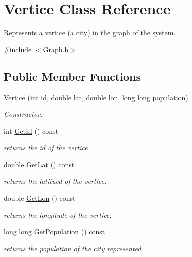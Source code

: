 \hypertarget{classVertice}{}\section{Vertice Class Reference}
\label{classVertice}


Represents a vertice (a city) in the graph of the system.  




{\ttfamily \#include $<$Graph.\+h$>$}

\subsection*{Public Member Functions}
\begin{DoxyCompactItemize}
\item 
\hyperlink{classVertice_a2af39e31011f5d6bf98d02d4570204ac}{Vertice} (int id, double lat, double lon, long long population)
\begin{DoxyCompactList}\small\item\em Constructor. \end{DoxyCompactList}\item 
\mbox{\label{classVertice_a1d7ab40271985b5e0335f65813d5efec}} 
int \hyperlink{classVertice_a1d7ab40271985b5e0335f65813d5efec}{Get\+Id} () const
\begin{DoxyCompactList}\small\item\em returns the id of the vertice. \end{DoxyCompactList}\item 
\mbox{\label{classVertice_acfbe0b5380adbc2985fa95824cef5ebe}} 
double \hyperlink{classVertice_acfbe0b5380adbc2985fa95824cef5ebe}{Get\+Lat} () const
\begin{DoxyCompactList}\small\item\em returns the latitued of the vertice. \end{DoxyCompactList}\item 
\mbox{\label{classVertice_a4abbcfcabdc677210fe708625a4182ed}} 
double \hyperlink{classVertice_a4abbcfcabdc677210fe708625a4182ed}{Get\+Lon} () const
\begin{DoxyCompactList}\small\item\em returns the longitude of the vertice. \end{DoxyCompactList}\item 
\mbox{\label{classVertice_afebf1bcd726a6fe4de797fce29310fb7}} 
long long \hyperlink{classVertice_afebf1bcd726a6fe4de797fce29310fb7}{Get\+Population} () const
\begin{DoxyCompactList}\small\item\em returns the population of the city represented. \end{DoxyCompactList}\end{DoxyCompactItemize}


